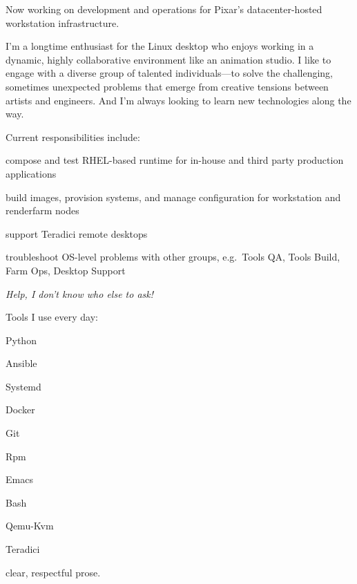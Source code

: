 
\begin{cvparagraph}

  Now working on development and operations for Pixar's datacenter-hosted workstation infrastructure.

  I'm a longtime enthusiast for the Linux desktop who enjoys working in a dynamic, highly collaborative environment like an animation studio.
  I like to engage with a diverse group of talented individuals---to solve the challenging, sometimes unexpected problems that emerge from creative tensions between artists and engineers.
  And I'm always looking to learn new technologies along the way.

  Current responsibilities include:
  \begin{cvitems1}
    \item compose and test RHEL-based runtime for in-house and third party production applications
    \item build images, provision systems, and manage configuration for workstation and renderfarm nodes
    \item support Teradici remote desktops
    \item troubleshoot OS-level problems with other groups, e.g.\ Tools QA, Tools Build, Farm Ops, Desktop Support
    \item \emph{Help, I don't know who else to ask!}
  \end{cvitems1}

  Tools I use every day:
  \begin{itemize*}[]
    \item Python
    \item Ansible
    \item Systemd
    \item Docker
    \item Git
    \item Rpm
    \item Emacs
    \item Bash
    \item Qemu-Kvm
    \item Teradici
    \item clear, respectful prose.
  \end{itemize*}

\end{cvparagraph}
